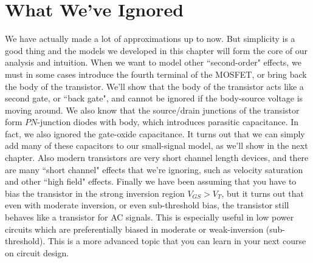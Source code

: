 \section{What We've Ignored}
We have actually made a lot of approximations up to now.  But simplicity is a good thing and the models we developed in this chapter will form the core of our analysis and intuition.  When we want to model other ``second-order" effects, we must in some cases introduce the fourth terminal of the MOSFET, or bring back the body of the transistor.  We'll show that the body of the transistor acts like a second gate, or ``back gate", and cannot be ignored if the body-source voltage is moving around.  We also know that the source/drain junctions of the transistor form $PN$-junction diodes with body, which  introduces parasitic capacitance.  In fact, we also ignored the gate-oxide capacitance. It turns out that we can simply add many of these capacitors to our small-signal model, as we'll show in the next chapter.
Also modern transistors are very short channel length devices, and there are many ``short channel" effects that we're ignoring, such as velocity saturation and other ``high field" effects.  Finally we have been assuming that you have to bias the transistor in the strong inversion region $V_{GS} > V_T$, but it turns out that even with moderate inversion, or even sub-threshold bias, the transistor still behaves like a transistor for AC signals.  This is especially useful in low power circuits which are preferentially biased in moderate or weak-inversion (sub-threshold).  This is a more advanced topic that you can learn in your next course on circuit design.
